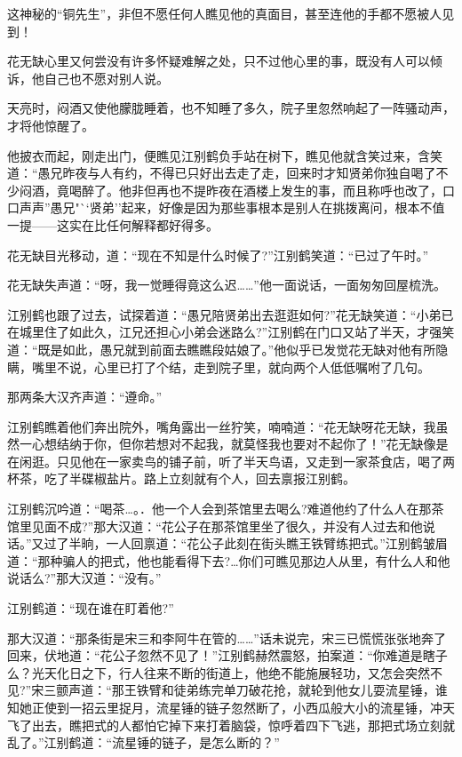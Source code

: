 \documentclass[12pt,oneside]{book}
\begin{document}
这神秘的``铜先生''，非但不愿任何人瞧见他的真面目，甚至连他的手都不愿被人见到！

花无缺心里又何尝没有许多怀疑难解之处，只不过他心里的事，既没有人可以倾诉，他自己也不愿对别人说。

天亮时，闷酒又使他朦胧睡着，也不知睡了多久，院子里忽然响起了一阵骚动声，才将他惊醒了。

他披衣而起，刚走出门，便瞧见江别鹤负手站在树下，瞧见他就含笑过来，含笑道：``愚兄昨夜与人有约，不得已只好出去走了走，回来时才知贤弟你独自喝了不少闷酒，竟喝醉了。他非但再也不提昨夜在酒楼上发生的事，而且称呼也改了，口口声声''愚兄"``贤弟''起来，好像是因为那些事根本是别人在挑拨离问，根本不值一提------这实在比任何解释都好得多。

花无缺目光移动，道：``现在不知是什么时候了?''江别鹤笑道：``已过了午时。''

花无缺失声道：``呀，我一觉睡得竟这么迟\ldots\ldots{}''他一面说话，一面匆匆回屋梳洗。

江别鹤也跟了过去，试探着道：``愚兄陪贤弟出去逛逛如何?''花无缺笑道：``小弟已在城里住了如此久，江兄还担心小弟会迷路么?''江别鹤在门口又站了半天，才强笑道：``既是如此，愚兄就到前面去瞧瞧段姑娘了。''他似乎已发觉花无缺对他有所隐瞒，嘴里不说，心里已打了个结，走到院子里，就向两个人低低嘱咐了几句。

那两条大汉齐声道：``遵命。''

江别鹤瞧着他们奔出院外，嘴角露出一丝狞笑，喃喃道：``花无缺呀花无缺，我虽然一心想结纳于你，但你若想对不起我，就莫怪我也要对不起你了！''花无缺像是在闲逛。只见他在一家卖鸟的铺子前，听了半天鸟语，又走到一家茶食店，喝了两杯茶，吃了半碟椒盐片。路上立刻就有个人，回去禀报江别鹤。

江别鹤沉吟道：``喝茶\ldots。．他一个人会到茶馆里去喝么?难道他约了什么人在那茶馆里见面不成?''那大汉道：``花公子在那茶馆里坐了很久，并没有人过去和他说话。''又过了半晌，一人回禀道：``花公子此刻在街头瞧王铁臂练把式。''江别鹤皱眉道：``那种骗人的把式，他也能看得下去?\ldots 你们可瞧见那边人从里，有什么人和他说话么?''那大汉道：``没有。''

江别鹤道：``现在谁在盯着他?''

那大汉道：``那条街是宋三和李阿牛在管的\ldots\ldots{}''话未说完，宋三已慌慌张张地奔了回来，伏地道：``花公子忽然不见了！''江别鹤赫然震怒，拍案道：``你难道是瞎子么？光天化日之下，行人往来不断的街道上，他绝不能施展轻功，又怎会突然不见?''宋三颤声道：``那王铁臂和徒弟练完单刀破花抢，就轮到他女儿耍流星锤，谁知她正使到一招云里捉月，流星锤的链子忽然断了，小西瓜般大小的流星锤，冲天飞了出去，瞧把式的人都怕它掉下来打着脑袋，惊呼着四下飞逃，那把式场立刻就乱了。''江别鹤道：``流星锤的链子，是怎么断的？''
\end{document}

